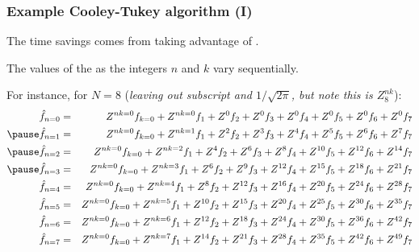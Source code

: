 \documentclass[hyperref={colorlinks=true}]{beamer}
\begin{document}
\begin{frame}%
  \frametitle{Example Cooley-Tukey algorithm (I)}
  
  The time savings comes from taking advantage of . 
  
  \mysp
  
  The values of the  as the integers $n$ and $k$ vary sequentially. 
  
  \mysp
  
  For instance, for $N = 8$ 
  {\footnotesize (\textit{leaving out subscript and $1/\sqrt{2\pi}$, but note this is $Z_8^{nk}$})}: \pause
  \begin{eqnarray}
    \hat{f}_{n=0} &=& Z^{nk=0} f_{k=0} + Z^{nk=0} f_{1} + Z^{0} f_{2} + Z^{0} f_{3} + Z^{0} f_{4} + Z^{0} f_{5} + Z^{0} f_{6} + Z^{0} f_{7} \nonumber \\ \pause
    \hat{f}_{n=1} &=& Z^{nk=0} f_{k=0} + Z^{nk=1} f_{1} + Z^{2} f_{2} + Z^{3} f_{3} + Z^{4} f_{4} + Z^{5} f_{5} + Z^{6} f_{6} + Z^{7} f_{7} \nonumber\\ \pause
    \hat{f}_{n=2} &=& Z^{nk=0} f_{k=0} + Z^{nk=2} f_{1} + Z^{4} f_{2} + Z^{6} f_{3} + Z^{8} f_{4} + Z^{10} f_{5} + Z^{12} f_{6} + Z^{14} f_{7} \nonumber \\ \pause
    \hat{f}_{n=3} &=& Z^{nk=0} f_{k=0} + Z^{nk=3} f_{1} + Z^{6} f_{2} + Z^{9} f_{3} + Z^{12} f_{4} + Z^{15} f_{5} + Z^{18} f_{6} + Z^{21} f_{7} \nonumber \\ 
    \hat{f}_{n=4} &=& Z^{nk=0} f_{k=0} + Z^{nk=4} f_{1} + Z^{8} f_{2} + Z^{12} f_{3} + Z^{16} f_{4} + Z^{20} f_{5} + Z^{24} f_{6} + Z^{28} f_{7} \nonumber \\
    \hat{f}_{n=5} &=& Z^{nk=0} f_{k=0} + Z^{nk=5} f_{1} + Z^{10} f_{2} + Z^{15} f_{3} + Z^{20} f_{4} + Z^{25} f_{5} + Z^{30} f_{6} + Z^{35} f_{7} \nonumber \\
    \hat{f}_{n=6} &=& Z^{nk=0} f_{k=0} + Z^{nk=6} f_{1} + Z^{12} f_{2} + Z^{18} f_{3} + Z^{24} f_{4} + Z^{30} f_{5} + Z^{36} f_{6} + Z^{42} f_{7} \nonumber \\
    \hat{f}_{n=7} &=& Z^{nk=0} f_{k=0} + Z^{nk=7} f_{1} + Z^{14} f_{2} + Z^{21} f_{3} + Z^{28} f_{4} + Z^{35} f_{5} + Z^{42} f_{6} + Z^{49} f_{7} \nonumber
  \end{eqnarray}

\end{frame}

\end{document}
